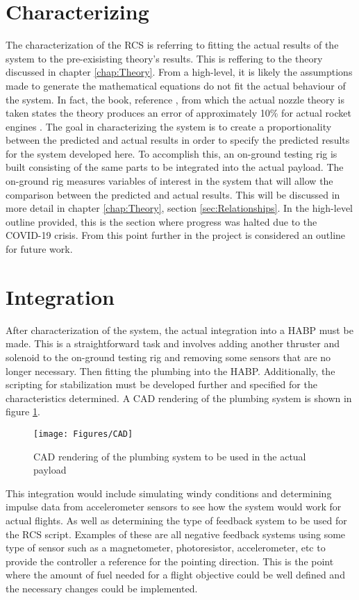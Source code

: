 \section{Characterizing}
The characterization of the RCS is referring to fitting the actual results of the system to the pre-exisisting theory's results. This is reffering to the theory discussed in chapter \ref{chap:Theory}. From a high-level, it is likely the assumptions made to generate the mathematical equations do not fit the actual behaviour of the system. In fact, the book, reference \cite{langton}, from which the actual nozzle theory is taken states the theory produces an error of approximately 10\% for actual rocket engines \cite{langton}. The goal in characterizing the system is to create a proportionality between the predicted and actual results in order to specify the predicted results for the system developed here. To accomplish this, an on-ground testing rig is built consisting of the same parts to be integrated into the actual payload. The on-ground rig measures variables of interest in the system that will allow the comparison between the predicted and actual results. This will be discussed in more detail in chapter \ref{chap:Theory}, section \ref{sec:Relationships}. In the high-level outline provided, this is the section where progress was halted due to the COVID-19 crisis. From this point further in the project is considered an outline for future work.
\section{Integration}
After characterization of the system, the actual integration into a HABP must be made. This is a straightforward task and involves adding another thruster and solenoid to the on-ground testing rig and removing some sensors that are no longer necessary. Then fitting the plumbing into the HABP. Additionally, the scripting for stabilization must be developed further and specified for the characteristics determined. A CAD rendering of the plumbing system is shown in figure \ref{fig:CAD}.
\begin{figure}[h!]
\centering
\texttt{[image: Figures/CAD]}
\caption{CAD rendering of the plumbing system to be used in the actual payload}
\label{fig:CAD}
\end{figure}
This integration would include simulating windy conditions and determining impulse data from accelerometer sensors to see how the system would work for actual flights. As well as determining the type of feedback system to be used for the RCS script. Examples of these are all negative feedback systems using some type of sensor such as a magnetometer, photoresistor, accelerometer, etc to provide the controller a reference for the pointing direction. This is the point where the amount of fuel needed for a flight objective could be well defined and the necessary changes could be implemented.
